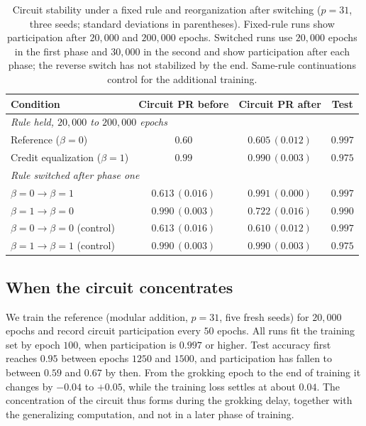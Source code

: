 \documentclass{article} %
\begin{document}
\begin{table}[!ht]
\caption{Circuit stability under a fixed rule and reorganization after switching ($p=31$, three seeds; standard deviations in parentheses). Fixed-rule runs show participation after $20{,}000$ and $200{,}000$ epochs. Switched runs use $20{,}000$ epochs in the first phase and $30{,}000$ in the second and show participation after each phase; the reverse switch has not stabilized by the end. Same-rule continuations control for the additional training.}
\label{tab:long}
\begin{center}
\small
\begin{tabular}{lccc}
\toprule
Condition & Circuit PR before & Circuit PR after & Test \\
\midrule
\multicolumn{4}{l}{\emph{Rule held, $20{,}000$ to $200{,}000$ epochs}} \\
Reference ($\beta{=}0$) & $0.60$ & $0.605\,(0.012)$ & $0.997$ \\
Credit equalization ($\beta{=}1$) & $0.99$ & $0.990\,(0.003)$ & $0.975$ \\
\midrule
\multicolumn{4}{l}{\emph{Rule switched after phase one}} \\
$\beta{=}0 \to \beta{=}1$ & $0.613\,(0.016)$ & $0.991\,(0.000)$ & $0.997$ \\
$\beta{=}1 \to \beta{=}0$ & $0.990\,(0.003)$ & $0.722\,(0.016)$ & $0.990$ \\
$\beta{=}0 \to \beta{=}0$ (control) & $0.613\,(0.016)$ & $0.610\,(0.012)$ & $0.997$ \\
$\beta{=}1 \to \beta{=}1$ (control) & $0.990\,(0.003)$ & $0.990\,(0.003)$ & $0.975$ \\
\bottomrule
\end{tabular}
\end{center}
\end{table}

\subsection{When the circuit concentrates}
\label{app:timing}
We train the reference (modular addition, $p = 31$, five fresh seeds) for $20{,}000$ epochs and record circuit participation every $50$ epochs. All runs fit the training set by epoch $100$, when participation is $0.997$ or higher. Test accuracy first reaches $0.95$ between epochs $1250$ and $1500$, and participation has fallen to between $0.59$ and $0.67$ by then. From the grokking epoch to the end of training it changes by $-0.04$ to $+0.05$, while the training loss settles at about $0.04$. The concentration of the circuit thus forms during the grokking delay, together with the generalizing computation, and not in a later phase of training.
\end{document}
